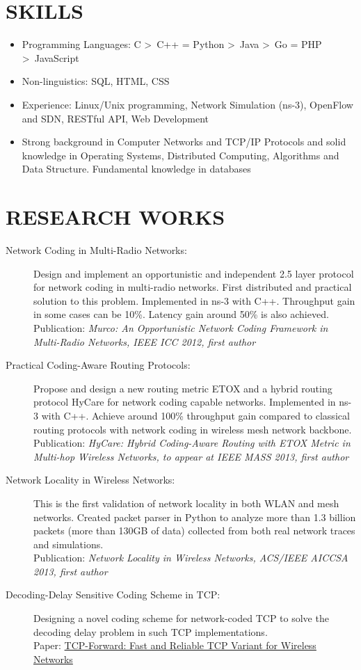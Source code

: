 \documentclass[line]{res}
\begin{document}
\begin{resume}
	\section{SKILLS}
	\begin{itemize}
		\item Programming Languages: C \textgreater \ C++ = Python \textgreater \ Java \textgreater \ Go = PHP \textgreater \ JavaScript
		\item Non-linguistics: SQL, HTML, CSS
		\item Experience: Linux/Unix programming, Network Simulation (ns-3), OpenFlow and SDN, RESTful API, Web Development
		\item Strong background in Computer Networks and TCP/IP Protocols and solid knowledge in Operating Systems, Distributed Computing, Algorithms and Data Structure. Fundamental knowledge in databases 
	\end{itemize}

	\section{RESEARCH WORKS}
	\begin{description}
		\item[Network Coding in Multi-Radio Networks:]
			Design and implement an opportunistic and independent 2.5 layer protocol for network coding in multi-radio networks. First distributed and practical solution to this problem. Implemented in ns-3 with C++. Throughput gain in some cases can be 10\%. Latency gain around 50\% is also achieved. \\
			Publication: \emph{Murco: An Opportunistic Network Coding Framework in Multi-Radio Networks, IEEE ICC 2012, first author}
		\item[Practical Coding-Aware Routing Protocols:]
			Propose and design a new routing metric ETOX and a hybrid routing protocol HyCare for network coding capable networks. Implemented in ns-3 with C++. Achieve around 100\% throughput gain compared to classical routing protocols with network coding in wireless mesh network backbone.\\
			Publication: \emph{HyCare: Hybrid Coding-Aware Routing with ETOX Metric in Multi-hop Wireless Networks, to appear at IEEE MASS 2013, first author}
		\item[Network Locality in Wireless Networks:]
			This is the first validation of network locality in both WLAN and mesh networks. Created packet parser in Python to analyze more than 1.3 billion packets (more than 130GB of data) collected from both real network traces and simulations. \\
			Publication: \emph{Network Locality in Wireless Networks, ACS/IEEE AICCSA 2013, first author}
		\item [Decoding-Delay Sensitive Coding Scheme in TCP:]
			Designing a novel coding scheme for network-coded TCP to solve the decoding delay problem in such TCP implementations. \\
			Paper: \href{http://arxiv.org/abs/1408.2626}{TCP-Forward: Fast and Reliable TCP Variant for Wireless Networks}
	\end{description}
	

\end{resume}
\end{document}
